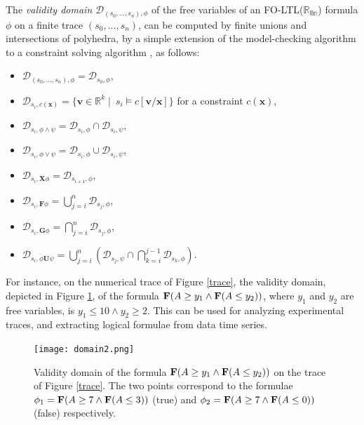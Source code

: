\documentclass[graybox]{svmult}
\newcommand{\op}[1]{\mathbf{\ensuremath{#1}}}
\newcommand{\vct}[1]{\bm{#1}}
\newcommand{\cl}[1]{\mathcal{#1}}
\def\Rlin{\mathbb{R_{\mbox{lin}}}}
\def\F{{\bf F}}
\begin{document}
The {\em validity domain} $\cl{D}_{(s_0,...,s_n), \phi}$
of the free variables of an FO-LTL($\Rlin$) formula $\phi$ on a finite trace $(s_0,...,s_n)$,
can be computed by finite unions and intersections of polyhedra, by a simple extension
of the model-checking algorithm to a constraint solving algorithm \cite{FR08tcs,FR09cp}, as follows:
\begin{itemize}
\item $\cl{D}_{(s_0,...,s_n), \phi} = \cl{D}_{s_0, \phi}$,
\item $\cl{D}_{s_i, c(\vct x)} =\{\vct{v}\in \mathbb{R}^k \mid\ s_i\models c[\vct{v}/\vct{x}] \}$ for a constraint $c(\vct x)$,
\item $\cl{D}_{s_i, \phi\wedge \psi} = \cl{D}_{s_i, \phi} \cap \cl{D}_{s_i, \psi}$,
\item $\cl{D}_{s_i, \phi\vee \psi} = \cl{D}_{s_i, \phi} \cup \cl{D}_{s_i, \psi}$,
\item $\cl{D}_{s_i, \op{X}\phi} = \cl{D}_{s_{i+1}, \phi},$
\item $\cl{D}_{s_i, \op{F}\phi} = \bigcup_{j=i}^n \cl{D}_{s_{j}, \phi}$,
\item $\cl{D}_{s_i, \op{G}\phi} = \bigcap_{j=i}^n \cl{D}_{s_{j}, \phi}$,
\item $\cl{D}_{s_i, \phi\op{U}\psi} = \bigcup_{j=i}^n ( \cl{D}_{s_{j}, \psi} \cap \bigcap_{k=i}^{j-1} \cl{D}_{s_{k}, \phi} )$.
\end{itemize}


For instance, on the numerical trace of Figure \ref{trace},
the validity domain, depicted in Figure \ref{domain},
of the formula $\F(A\ge y_1\wedge\F(A\le y_2))$, where $y_1$ and $y_2$ are free variables,
is $y_1\le 10\wedge y_2\ge 2$.
This can be used for analyzing experimental traces,
and extracting logical formulae from data time series.




\begin{figure}[htb]
\centering
\texttt{[image: domain2.png]} %
\caption{ \label{domain} Validity domain of the formula $\F(A\ge y_1\wedge\F(A\le y_2))$
on the trace of Figure \ref{trace}.
The two points correspond to the formulae $\phi_1=\F(A\ge 7\wedge\F(A\le 3))$ (true)
and $\phi_2=\F(A\ge 7\wedge\F(A\le 0))$ (false) respectively.}
\end{figure}


\end{document}
